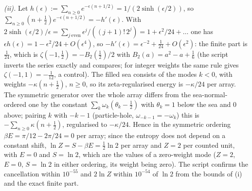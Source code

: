 \emph{(ii).} Let $h(\epsilon) := \sum_{n \geq 0}e^{-\epsilon(n + 1/2)} = 1/(2\sinh(\epsilon/2))$, so $\sum_{n \geq 0}(n + \tfrac12)e^{-\epsilon(n + 1/2)} = -h'(\epsilon)$. With $2\sinh(\epsilon/2)/\epsilon = \sum_{j\ \mathrm{even}}\epsilon^{j}/((j + 1)!\,2^{j}) = 1 + \epsilon^{2}/24 + \ldots$ one has $\epsilon h(\epsilon) = 1 - \epsilon^{2}/24 + O(\epsilon^{4})$, so $-h'(\epsilon) = \epsilon^{-2} + \tfrac{1}{24} + O(\epsilon^{2})$: the finite part is $\tfrac1{24}$, which is $\zeta(-1, \tfrac12) = -B_{2}(\tfrac12)/2$ with $B_{2}(a) = a^{2} - a + \tfrac16$ (the script inverts the series exactly and compares; for integer weights the same rule gives $\zeta(-1, 1) = -\tfrac1{12}$, a control). The filled sea consists of the modes $k < 0$, with weights $-\kappa(n + \tfrac12)$, $n \geq 0$, so its zeta-regularised energy is $-\kappa/24$ per array. The symmetric generator over the whole array differs from the sea-normal-ordered one by the constant $\sum_{k}\omega_{k}(\theta_{k} - \tfrac12)$ with $\theta_{k} = 1$ below the sea and $0$ above; pairing $k$ with $-k-1$ (particle-hole, $\omega_{-k-1} = -\omega_{k}$) this is $-\sum_{n \geq 0}\kappa(n + \tfrac12)$, regularised to $-\kappa/24$. Hence in the symmetric ordering $\beta E = \pi/12 - 2\pi/24 = 0$ per array; since the entropy does not depend on a constant shift, $\ln Z = S - \beta E = \tfrac12\ln 2$ per array and $Z = 2$ per counted unit, with $E = 0$ and $S = \ln 2$, which are the values of a zero-weight mode ($Z = 2$, $E = 0$, $S = \ln 2$ in either ordering, its weight being zero). The script confirms the cancellation within $10^{-55}$ and $2\ln Z$ within $10^{-54}$ of $\ln 2$ from the bounds of (i) and the exact finite part.

